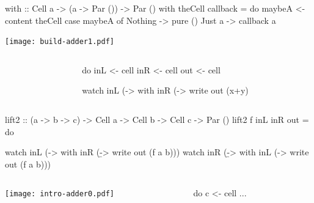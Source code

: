 \documentclass[UKenglish,usenames,dvipsnames,svgnames,table,aspectratio=169,mathserif]{beamer}
\newcommand{\nl}{\vspace{\baselineskip}}
\begin{document}
\begin{frame}[fragile]
\begin{haskellcode}
          with :: Cell a -> (a -> Par ()) -> Par ()
          with theCell callback =
            do  maybeA <- content theCell
                case maybeA of
                  Nothing -> pure ()
                  Just a  -> callback a
\end{haskellcode}
\end{frame}


\begin{frame}[fragile]
\centering

\begin{overlayarea}{0.5\textwidth}{0.4\textheight}
\texttt{[image: build-adder1.pdf]}
\end{overlayarea}

\begin{columns}
\begin{column}{0.3\textwidth}
\end{column}
\begin{column}{0.7\textwidth}
\begin{haskellcode}
do  inL  <- cell
    inR  <- cell
    out  <- cell
\end{haskellcode}
\nl
\begin{haskellcode}
  watch inL (\x ->
    with inR (\y ->
      write out (x+y)
\end{haskellcode}
\end{column}
\end{columns}
\end{frame}


\begin{frame}[fragile]
\begin{haskellcode}
          lift2 :: (a -> b -> c)
                -> Cell a -> Cell b -> Cell c
                -> Par ()
          lift2 f inL inR out = do

            watch inL (\a ->
              with inR (\b ->
                write out (f a b)))
            watch inR (\b ->
              with inL (\a ->
                write out (f a b)))
\end{haskellcode}

\end{frame}


\iffalse

\begin{frame}[fragile]
\begin{columns}
\begin{column}{0.5\textwidth}
\texttt{[image: intro-adder0.pdf]}
\end{column}
\begin{column}{0.5\textwidth}
\begin{haskellcode}
do
  c <- cell
  ...
\end{haskellcode}
\end{column}
\end{columns}
\end{frame}
\end{document}
